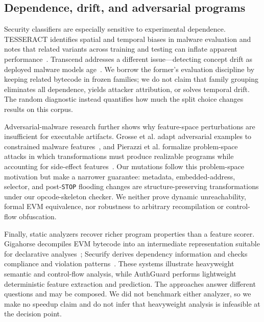\subsection{Dependence, drift, and adversarial programs}

Security classifiers are especially sensitive to experimental dependence. TESSERACT identifies spatial and temporal biases in malware evaluation and notes that related variants across training and testing can inflate apparent performance~\cite{pendlebury2019tesseract}. Transcend addresses a different issue---detecting concept drift as deployed malware models age~\cite{jordaney2017transcend}. We borrow the former's evaluation discipline by keeping related bytecode in frozen families; we do not claim that family grouping eliminates all dependence, yields attacker attribution, or solves temporal drift. The random diagnostic instead quantifies how much the split choice changes results on this corpus.

Adversarial-malware research further shows why feature-space perturbations are insufficient for executable artifacts. Grosse et al. adapt adversarial examples to constrained malware features~\cite{grosse2017adversarial}, and Pierazzi et al. formalize problem-space attacks in which transformations must produce realizable programs while accounting for side-effect features~\cite{pierazzi2020problemspace}. Our mutations follow this problem-space motivation but make a narrower guarantee: metadata, embedded-address, selector, and post-\texttt{STOP} flooding changes are structure-preserving transformations under our opcode-skeleton checker. We neither prove dynamic unreachability, formal EVM equivalence, nor robustness to arbitrary recompilation or control-flow obfuscation.

Finally, static analyzers recover richer program properties than a feature scorer. Gigahorse decompiles EVM bytecode into an intermediate representation suitable for declarative analyses~\cite{grech2019gigahorse}; Securify derives dependency information and checks compliance and violation patterns~\cite{tsankov2018securify}. These systems illustrate heavyweight semantic and control-flow analysis, while AuthGuard performs lightweight deterministic feature extraction and prediction. The approaches answer different questions and may be composed. We did not benchmark either analyzer, so we make no speedup claim and do not infer that heavyweight analysis is infeasible at the decision point.
